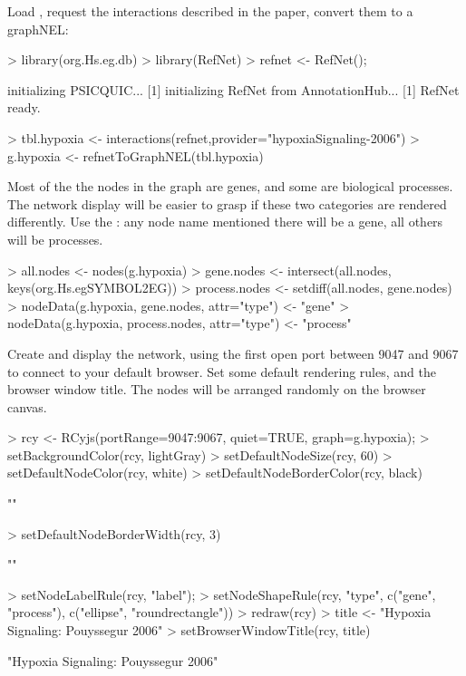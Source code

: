 \documentclass{article}
\begin{document}
Load , request the interactions described in the paper, convert them to a graphNEL:
\begin{Schunk}
\begin{Sinput}
> library(org.Hs.eg.db)
> library(RefNet)
> refnet <- RefNet();
\end{Sinput}
\begin{Soutput}
[1] initializing PSICQUIC...
[1] initializing RefNet from AnnotationHub...
[1] RefNet ready.
\end{Soutput}
\begin{Sinput}
> tbl.hypoxia <- interactions(refnet,provider="hypoxiaSignaling-2006")
> g.hypoxia <- refnetToGraphNEL(tbl.hypoxia)
\end{Sinput}
\end{Schunk}
Most of the the nodes in the graph are genes, and some are biological processes.  The network display will
be easier to grasp if these two categories are rendered differently.   Use the :
any node name mentioned there will be a gene, all others will be processes.

\begin{Schunk}
\begin{Sinput}
> all.nodes <- nodes(g.hypoxia)
> gene.nodes <- intersect(all.nodes, keys(org.Hs.egSYMBOL2EG))
> process.nodes <- setdiff(all.nodes, gene.nodes)
> nodeData(g.hypoxia, gene.nodes, attr="type") <- "gene"
> nodeData(g.hypoxia, process.nodes, attr="type") <- "process"
\end{Sinput}
\end{Schunk}

Create and display the network, using the first open port between 9047 and 9067 to connect to your
default browser.  Set some default rendering rules, and the browser window title.  The nodes
will be arranged randomly on the browser canvas.

\begin{Schunk}
\begin{Sinput}
> rcy <- RCyjs(portRange=9047:9067, quiet=TRUE, graph=g.hypoxia);
> setBackgroundColor(rcy, lightGray)
> setDefaultNodeSize(rcy, 60)
> setDefaultNodeColor(rcy, white)
> setDefaultNodeBorderColor(rcy, black)
\end{Sinput}
\begin{Soutput}
[1] ""
\end{Soutput}
\begin{Sinput}
> setDefaultNodeBorderWidth(rcy, 3)
\end{Sinput}
\begin{Soutput}
[1] ""
\end{Soutput}
\begin{Sinput}
> setNodeLabelRule(rcy, "label");
> setNodeShapeRule(rcy, "type", c("gene", "process"), c("ellipse", "roundrectangle"))
> redraw(rcy)
> title <- "Hypoxia Signaling: Pouyssegur 2006"
> setBrowserWindowTitle(rcy, title)
\end{Sinput}
\begin{Soutput}
[1] "Hypoxia Signaling: Pouyssegur 2006"
\end{Soutput}
\end{Schunk}
\end{document}
